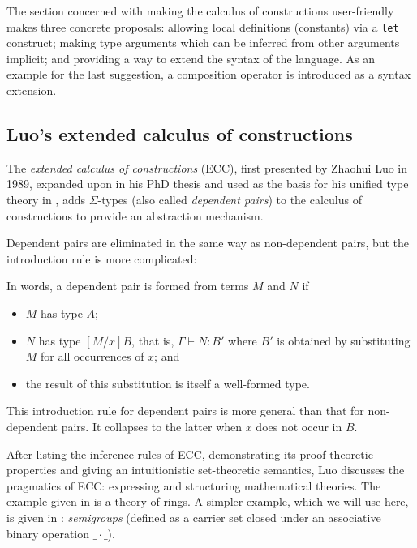 \documentclass[12pt,toc=bibliography,numbers=noendperiod,
               footnotes=multiple,twoside]{scrartcl}
\begin{document}
The section concerned with making the calculus of constructions user-friendly makes three concrete proposals: allowing local definitions (constants) via a \texttt{let} construct; making type arguments which can be inferred from other arguments implicit; and providing a way to extend the syntax of the language. As an example for the last suggestion, a composition operator is introduced as a syntax extension.


\subsection{Luo's extended calculus of constructions}

The \emph{extended calculus of constructions} (ECC), first presented by Zhaohui Luo in 1989\autocite{luo_ecc_1989}, expanded upon in his PhD thesis\autocite{luo_extended_1990} and used as the basis for his unified type theory in \autocite{luo_computation_1994}, adds \(\Sigma\)-types (also called \emph{dependent pairs}) to the calculus of constructions to provide an abstraction mechanism.

Dependent pairs are eliminated in the same way as non-dependent pairs, but the introduction rule is more complicated:

\begin{prooftree}
\end{prooftree}

In words, a dependent pair is formed from terms \(M\) and \(N\) if

\begin{itemize}
\item \(M\) has type \(A\);
\item \(N\) has type \([M/x] B\), that is, \(\Gamma \vdash N:B'\) where \(B'\) is obtained by substituting \(M\) for all occurrences of \(x\); and
\item the result of this substitution is itself a well-formed type.
\end{itemize}

This introduction rule for dependent pairs is more general than that for non-dependent pairs. It collapses to the latter when \(x\) does not occur in \(B\).

After listing the inference rules of ECC, demonstrating its proof-theoretic properties and giving an intuitionistic set-theoretic semantics, Luo discusses the pragmatics of ECC: expressing and structuring mathematical theories. The example given in \textcite{luo_ecc_1989} is a theory of rings. A simpler example, which we will use here, is given in \textcite{luo_extended_1990}: \emph{semigroups} (defined as a carrier set closed under an associative binary operation \(\_\cdot\_\)).
\end{document}
